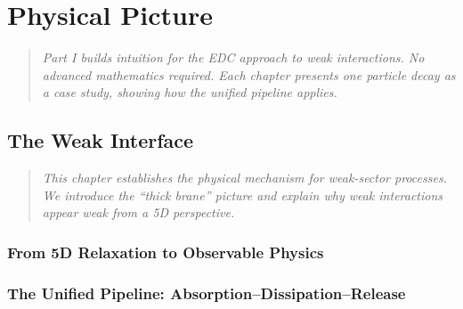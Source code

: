 \documentclass[11pt,a4paper]{book}
\theoremstyle{definition}
\theoremstyle{remark}
\begin{document}
\tableofcontents

\mainmatter


\part{Physical Picture}
\label{part:physical_picture}

\begin{quote}
\textit{Part I builds intuition for the EDC approach to weak interactions.
No advanced mathematics required. Each chapter presents one particle decay
as a case study, showing how the unified pipeline applies.}
\end{quote}

\chapter{The Weak Interface}
\label{ch:weak_interface}

\begin{quote}
\textit{This chapter establishes the physical mechanism for weak-sector processes.
We introduce the ``thick brane'' picture and explain why weak interactions appear
weak from a 5D perspective.}
\end{quote}

\section{From 5D Relaxation to Observable Physics}
\label{sec:5d_to_observable}



\section{The Unified Pipeline: Absorption--Dissipation--Release}
\end{document}
